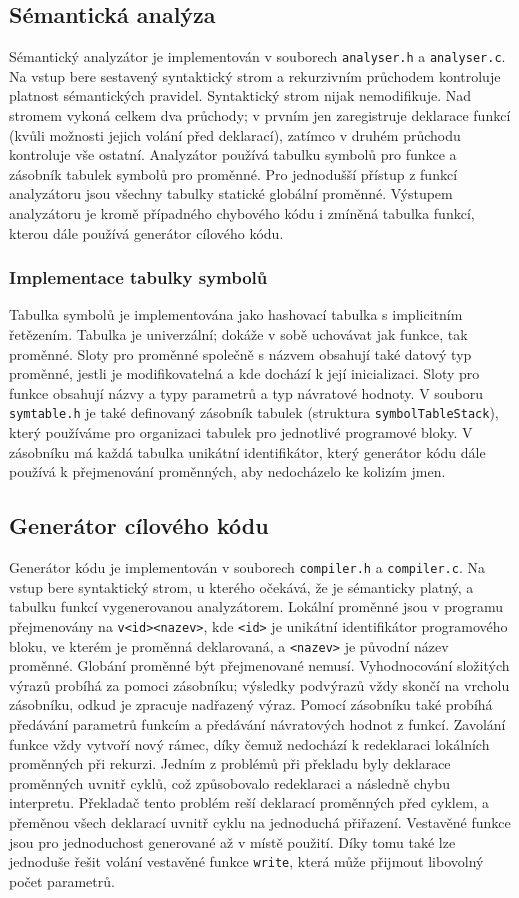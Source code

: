 \subsection{Sémantická analýza}
Sémantický analyzátor je implementován v souborech \texttt{analyser.h} a \texttt{analyser.c}.
Na vstup bere sestavený syntaktický strom a rekurzivním průchodem kontroluje platnost sémantických pravidel.
Syntaktický strom nijak nemodifikuje.
Nad stromem vykoná celkem dva průchody; v prvním jen zaregistruje deklarace funkcí (kvůli možnosti jejich volání před deklarací),
zatímco v druhém průchodu kontroluje vše ostatní.
Analyzátor používá tabulku symbolů pro funkce a zásobník tabulek symbolů pro proměnné.
Pro jednodušší přístup z funkcí analyzátoru jsou všechny tabulky statické globální proměnné.
Výstupem analyzátoru je kromě případného chybového kódu i zmíněná tabulka funkcí, kterou dále používá generátor cílového kódu.

\subsubsection{Implementace tabulky symbolů}
Tabulka symbolů je implementována jako hashovací tabulka s implicitním řetězením.
Tabulka je univerzální; dokáže v sobě uchovávat jak funkce, tak proměnné.
Sloty pro proměnné společně s názvem obsahují také datový typ proměnné,
jestli je modifikovatelná a kde dochází k její inicializaci.
Sloty pro funkce obsahují názvy a typy parametrů a typ návratové hodnoty.
V souboru \texttt{symtable.h} je také definovaný zásobník tabulek (struktura \texttt{symbolTableStack}),
který používáme pro organizaci tabulek pro jednotlivé programové bloky.
V zásobníku má každá tabulka unikátní identifikátor,
který generátor kódu dále používá k přejmenování proměnných, aby nedocházelo ke kolizím jmen.

\subsection{Generátor cílového kódu}
Generátor kódu je implementován v souborech \texttt{compiler.h} a \texttt{compiler.c}.
Na vstup bere syntaktický strom, u kterého očekává, že je sémanticky platný, a tabulku funkcí vygenerovanou analyzátorem.
Lokální proměnné jsou v programu přejmenovány na \texttt{v<id><nazev>}, kde \texttt{<id>} je unikátní identifikátor
programového bloku, ve kterém je proměnná deklarovaná, a \texttt{<nazev>} je původní název proměnné.
Globání proměnné být přejmenované nemusí.
Vyhodnocování složitých výrazů probíhá za pomoci zásobníku; výsledky podvýrazů vždy skončí na vrcholu zásobníku, odkud je zpracuje nadřazený výraz.
Pomocí zásobníku také probíhá předávání parametrů funkcím a předávání návratových hodnot z funkcí.
Zavolání funkce vždy vytvoří nový rámec, díky čemuž nedochází k redeklaraci lokálních proměnných při rekurzi.
Jedním z problémů při překladu byly deklarace proměnných uvnitř cyklů, což způsobovalo redeklaraci a následně chybu interpretu.
Překladač tento problém reší deklarací proměnných před cyklem, a přeměnou všech deklarací uvnitř cyklu na jednoduchá přiřazení.
Vestavěné funkce jsou pro jednoduchost generované až v místě použití.
Díky tomu také lze jednoduše řešit volání vestavěné funkce \texttt{write}, která může přijmout libovolný počet parametrů.
